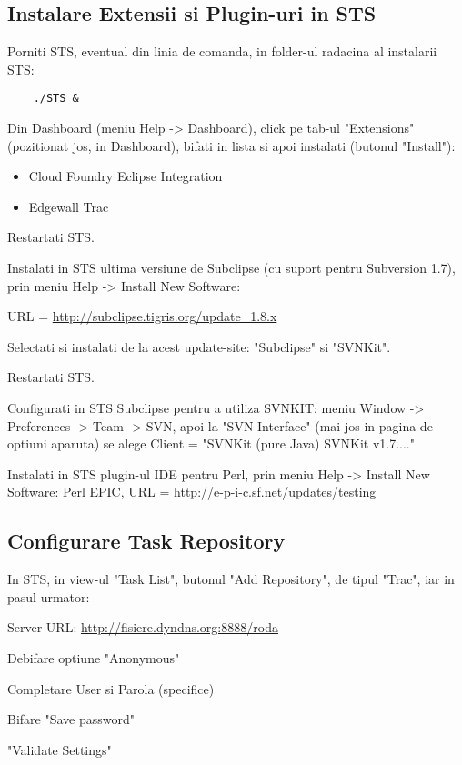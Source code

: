 \subsection{Instalare Extensii si Plugin-uri in STS}

Porniti STS, eventual din linia de comanda, in folder-ul radacina al instalarii STS:
\begin{lstlisting}	
	./STS &
\end{lstlisting}

Din Dashboard (meniu Help -> Dashboard), click pe tab-ul "Extensions"
(pozitionat jos, in Dashboard), bifati in lista si apoi instalati (butonul
"Install"):
\begin{itemize}
  \item Cloud Foundry Eclipse Integration
  \item Edgewall Trac
\end{itemize} 

Restartati STS.

Instalati in STS ultima versiune de Subclipse (cu suport pentru Subversion 1.7), prin meniu Help -> Install New Software:

URL = \url{http://subclipse.tigris.org/update_1.8.x}
	
Selectati si instalati de la acest update-site: "Subclipse" si "SVNKit".

Restartati STS.

Configurati in STS Subclipse pentru a utiliza SVNKIT: 
meniu Window -> Preferences -> Team -> SVN, 
apoi la "SVN Interface" (mai jos in pagina de optiuni aparuta) se alege Client = "SVNKit (pure Java) SVNKit v1.7...."

Instalati in STS plugin-ul IDE pentru Perl, prin meniu Help -> Install
New Software:
Perl EPIC, URL = \url{http://e-p-i-c.sf.net/updates/testing}

\subsection{Configurare Task Repository}
In STS, in view-ul "Task List", butonul "Add Repository", de tipul "Trac", 
iar in pasul urmator:

Server URL:    \url{http://fisiere.dyndns.org:8888/roda}

Debifare optiune "Anonymous"

Completare User si Parola (specifice)

Bifare "Save password"

"Validate Settings"

